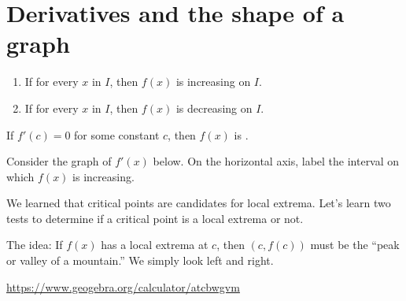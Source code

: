 \documentclass[../main.tex]{subfiles}
\begin{document}
 \section{Derivatives and the shape of a graph}

  \begin{center}
    \hfill{}
    
    \hfill{}
    
    \hfill{}
    
    \hfill{}
    
    \hfill{}
  \end{center}

  \begin{mdframed}[style=simple-compact]
    \begin{enumerate}[label=(\alph*)]
      \item If \underline{\hspace{1.5in}} for every \(x\) in \(I\), then \(f(x)\) is increasing on \(I\).
      \item If \underline{\hspace{1.5in}} for every \(x\) in \(I\), then \(f(x)\) is decreasing on \(I\).
    \end{enumerate}
  \end{mdframed}

  \faStar{} If \(f'(c) = 0\) for some constant \(c\), then \(f(x)\) is \underline{\hspace{3.5in}}.

  \begin{example}
    Consider the graph of \(f'(x)\) below. On the horizontal axis, label the interval on which \(f(x)\) is increasing. 

    \begin{center}
    
    \end{center}
  \end{example}

  We learned that critical points are candidates for local extrema. Let's learn two tests to determine if a critical point is a local extrema or not.

  The idea: If \(f(x)\) has a local extrema at \(c\), then \((c,f(c))\) must be the ``peak or valley of a mountain.''  We simply look left and right.
  \begin{center}
    
    \hfill
    
    \hfill
    

    \url{https://www.geogebra.org/calculator/atcbwgvm}
  \end{center}
  \clearpage
\end{document}
